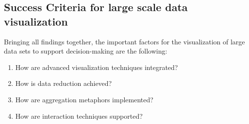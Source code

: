 \subsection{Success Criteria for large scale data visualization}
Bringing all findings together, the important factors for the visualization of large data sets to support decision-making are the following: 
\begin{enumerate}[noitemsep]
\item How are advanced visualization techniques integrated? 
\item How is data reduction achieved? 
\item How are aggregation metaphors implemented? 
\item How are interaction techniques supported?
\end{enumerate}

